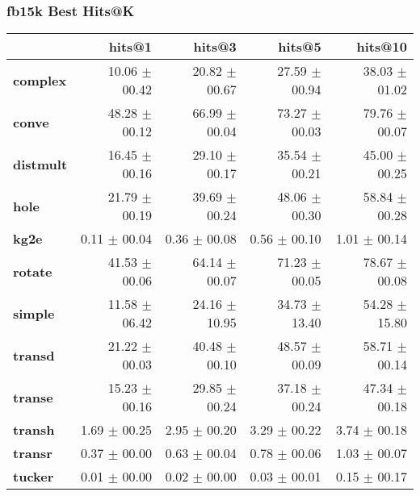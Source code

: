 \documentclass{article}
\begin{document}
\subsubsection{fb15k Best Hits@K}
    \begin{center}
    \begin{tabular}{lrrrr}
\toprule
{} &         hits@1 &         hits@3 &         hits@5 &        hits@10 \\
\midrule
\textbf{complex } &  10.06 $\pm$ 00.42 &  20.82 $\pm$ 00.67 &  27.59 $\pm$ 00.94 &  38.03 $\pm$ 01.02 \\
\textbf{conve   } &  48.28 $\pm$ 00.12 &  66.99 $\pm$ 00.04 &  73.27 $\pm$ 00.03 &  79.76 $\pm$ 00.07 \\
\textbf{distmult} &  16.45 $\pm$ 00.16 &  29.10 $\pm$ 00.17 &  35.54 $\pm$ 00.21 &  45.00 $\pm$ 00.25 \\
\textbf{hole    } &  21.79 $\pm$ 00.19 &  39.69 $\pm$ 00.24 &  48.06 $\pm$ 00.30 &  58.84 $\pm$ 00.28 \\
\textbf{kg2e    } &   0.11 $\pm$ 00.04 &   0.36 $\pm$ 00.08 &   0.56 $\pm$ 00.10 &   1.01 $\pm$ 00.14 \\
\textbf{rotate  } &  41.53 $\pm$ 00.06 &  64.14 $\pm$ 00.07 &  71.23 $\pm$ 00.05 &  78.67 $\pm$ 00.08 \\
\textbf{simple  } &  11.58 $\pm$ 06.42 &  24.16 $\pm$ 10.95 &  34.73 $\pm$ 13.40 &  54.28 $\pm$ 15.80 \\
\textbf{transd  } &  21.22 $\pm$ 00.03 &  40.48 $\pm$ 00.10 &  48.57 $\pm$ 00.09 &  58.71 $\pm$ 00.14 \\
\textbf{transe  } &  15.23 $\pm$ 00.16 &  29.85 $\pm$ 00.24 &  37.18 $\pm$ 00.24 &  47.34 $\pm$ 00.18 \\
\textbf{transh  } &   1.69 $\pm$ 00.25 &   2.95 $\pm$ 00.20 &   3.29 $\pm$ 00.22 &   3.74 $\pm$ 00.18 \\
\textbf{transr  } &   0.37 $\pm$ 00.00 &   0.63 $\pm$ 00.04 &   0.78 $\pm$ 00.06 &   1.03 $\pm$ 00.07 \\
\textbf{tucker  } &   0.01 $\pm$ 00.00 &   0.02 $\pm$ 00.00 &   0.03 $\pm$ 00.01 &   0.15 $\pm$ 00.17 \\
\bottomrule
\end{tabular}

    \end{center}
\end{document}

